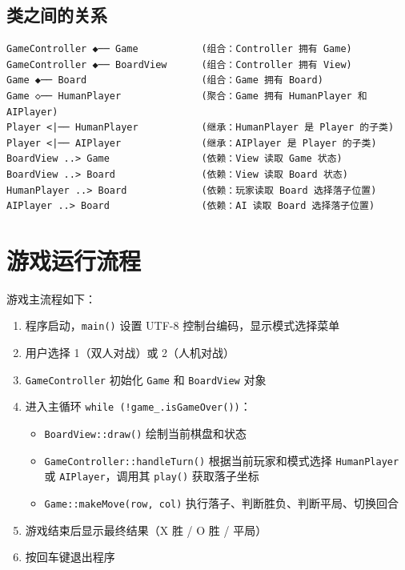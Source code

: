 \documentclass[12pt,a4paper]{ctexart}
\begin{document}
\subsection{类之间的关系}

\begin{verbatim}
GameController ◆── Game           (组合：Controller 拥有 Game)
GameController ◆── BoardView      (组合：Controller 拥有 View)
Game ◆── Board                    (组合：Game 拥有 Board)
Game ◇── HumanPlayer              (聚合：Game 拥有 HumanPlayer 和 AIPlayer)
Player <|── HumanPlayer           (继承：HumanPlayer 是 Player 的子类)
Player <|── AIPlayer              (继承：AIPlayer 是 Player 的子类)
BoardView ..> Game                (依赖：View 读取 Game 状态)
BoardView ..> Board               (依赖：View 读取 Board 状态)
HumanPlayer ..> Board             (依赖：玩家读取 Board 选择落子位置)
AIPlayer ..> Board                (依赖：AI 读取 Board 选择落子位置)
\end{verbatim}

\section{游戏运行流程}

游戏主流程如下：

\begin{enumerate}[itemsep=3pt]
    \item 程序启动，\texttt{main()} 设置 UTF-8 控制台编码，显示模式选择菜单
    \item 用户选择 1（双人对战）或 2（人机对战）
    \item \texttt{GameController} 初始化 \texttt{Game} 和 \texttt{BoardView} 对象
    \item 进入主循环 \texttt{while (!game\_.isGameOver())}：
    \begin{itemize}[itemsep=2pt]
        \item \texttt{BoardView::draw()} 绘制当前棋盘和状态
        \item \texttt{GameController::handleTurn()} 根据当前玩家和模式选择 \texttt{HumanPlayer} 或 \texttt{AIPlayer}，调用其 \texttt{play()} 获取落子坐标
        \item \texttt{Game::makeMove(row, col)} 执行落子、判断胜负、判断平局、切换回合
    \end{itemize}
    \item 游戏结束后显示最终结果（X 胜 / O 胜 / 平局）
    \item 按回车键退出程序
\end{enumerate}
\end{document}

